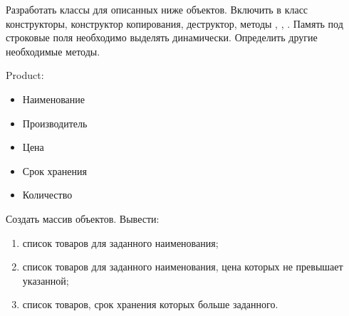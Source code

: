 
Разработать классы для описанных ниже объектов. Включить в класс
конструкторы, конструктор копирования, деструктор, методы ,
, . Память под строковые поля необходимо выделять
динамически. Определить другие необходимые методы.

Product:
\begin{itemize}
	\item Наименование
	\item Производитель
	\item Цена
	\item Срок хранения
	\item Количество
\end{itemize}

Создать массив объектов. Вывести:
\begin{enumerate}
	\item список товаров для заданного наименования;
	\item список товаров для заданного наименования, цена которых не превышает указанной;
	\item список товаров, срок хранения которых больше заданного.
\end{enumerate}
